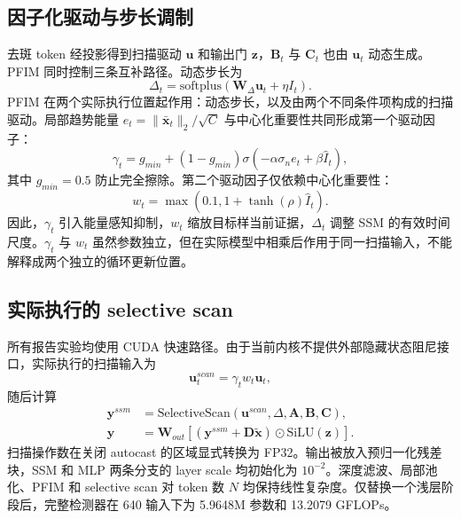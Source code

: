 \documentclass[10pt,twocolumn]{ctexart}
\begin{document}
\subsection{因子化驱动与步长调制}

去斑 token 经投影得到扫描驱动 $\mathbf{u}$ 和输出门 $\mathbf{z}$，$\mathbf{B}_t$ 与 $\mathbf{C}_t$ 也由 $\mathbf{u}_t$ 动态生成。PFIM 同时控制三条互补路径。动态步长为
\begin{equation}
\Delta_t=\mathrm{softplus}(\mathbf{W}_{\Delta}\mathbf{u}_t+\eta I_t).
\end{equation}
PFIM 在两个实际执行位置起作用：动态步长，以及由两个不同条件项构成的扫描驱动。局部趋势能量 $e_t=\lVert\bar{\mathbf{x}}_t\rVert_2/\sqrt{C}$ 与中心化重要性共同形成第一个驱动因子：
\begin{equation}
\gamma_t=g_{min}+(1-g_{min})
\sigma(-\alpha\sigma_n e_t+\beta\widehat I_t),
\end{equation}
其中 $g_{min}=0.5$ 防止完全擦除。第二个驱动因子仅依赖中心化重要性：
\begin{equation}
w_t=\max(0.1,1+\tanh(\rho)\widehat I_t).
\end{equation}
因此，$\gamma_t$ 引入能量感知抑制，$w_t$ 缩放目标样当前证据，$\Delta_t$ 调整 SSM 的有效时间尺度。$\gamma_t$ 与 $w_t$ 虽然参数独立，但在实际模型中相乘后作用于同一扫描输入，不能解释成两个独立的循环更新位置。

\subsection{实际执行的 selective scan}

所有报告实验均使用 CUDA 快速路径。由于当前内核不提供外部隐藏状态阻尼接口，实际执行的扫描输入为
\begin{equation}
\mathbf{u}^{scan}_t=\gamma_t w_t\mathbf{u}_t,
\end{equation}
随后计算
\begin{align}
\mathbf{y}^{ssm}&=\mathrm{SelectiveScan}(\mathbf{u}^{scan},\Delta,\mathbf{A},\mathbf{B},\mathbf{C}),\\
\mathbf{y}&=\mathbf{W}_{out}[(\mathbf{y}^{ssm}+\mathbf{D}\widetilde{\mathbf{x}})
\odot\mathrm{SiLU}(\mathbf{z})].
\end{align}
扫描操作数在关闭 autocast 的区域显式转换为 FP32。输出被放入预归一化残差块，SSM 和 MLP 两条分支的 layer scale 均初始化为 $10^{-2}$。深度滤波、局部池化、PFIM 和 selective scan 对 token 数 $N$ 均保持线性复杂度。仅替换一个浅层阶段后，完整检测器在 640 输入下为 5.9648M 参数和 13.2079 GFLOPs。
\end{document}
